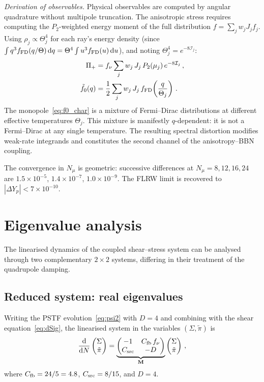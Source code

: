 \documentclass[a4paper,11pt]{article}
\newcommand{\Sig}{\Sigma}
\newcommand{\Yp}{Y_p}
\newcommand{\dd}{\mathrm{d}}
\begin{document}
\textit{Derivation of observables.}  Physical observables are computed by angular quadrature without multipole truncation.  The anisotropic stress requires computing the $P_2$-weighted energy moment of the full distribution $f = \sum_j w_j J_j f_j$.  Using $\rho_j \propto \Theta_j^4$ for each ray's energy density (since $\int q^3 f_{\rm FD}(q/\Theta)\,\dd q = \Theta^4 \int u^3 f_{\rm FD}(u)\,\dd u$), and noting $\Theta_j^4 = e^{-8\mathcal{I}_j}$:
\begin{align}
\Pi_+ &= f_\nu \sum_j w_j\,J_j\,P_2(\mu_j)\,e^{-8\mathcal{I}_j}\,,\label{eq:Pi_char}\\
\tilde{f}_0(q) &= \frac{1}{2}\sum_j w_j\,J_j\,f_{\rm FD}\!\left(\frac{q}{\Theta_j}\right)\,.\label{eq:f0_char}
\end{align}
The monopole~\eqref{eq:f0_char} is a mixture of Fermi--Dirac distributions at different effective temperatures $\Theta_j$.  This mixture is manifestly $q$-dependent: it is not a Fermi--Dirac at any single temperature.  The resulting spectral distortion modifies weak-rate integrands and constitutes the second channel of the anisotropy--BBN coupling.

The convergence in $N_\mu$ is geometric: successive differences at $N_\mu = 8, 12, 16, 24$ are $1.5\times 10^{-5}$, $1.4\times 10^{-7}$, $1.0\times 10^{-9}$.  The FLRW limit is recovered to $|\Delta\Yp| < 7\times 10^{-10}$.


\section{Eigenvalue analysis}\label{sec:eigenvalues}

The linearised dynamics of the coupled shear--stress system can be analysed through two complementary $2\times 2$ systems, differing in their treatment of the quadrupole damping.

\subsection{Reduced system: real eigenvalues}\label{sec:eigen_reduced}

Writing the PSTF evolution~\eqref{eq:psi2} with $D = 4$ and combining with the shear equation~\eqref{eq:dSig}, the linearised system in the variables $(\Sig, \tilde\pi)$ is
\begin{equation}
\frac{\dd}{\dd N}\begin{pmatrix} \Sig \\ \tilde\pi \end{pmatrix}
= \underbrace{\begin{pmatrix} -1 & C_{\rm fb}\,f_\nu \\ C_{\rm src} & -D \end{pmatrix}}_{\mathbf{M}}
\begin{pmatrix} \Sig \\ \tilde\pi \end{pmatrix}\,,\label{eq:matrix_reduced}
\end{equation}
where $C_{\rm fb} = 24/5 = 4.8$, $C_{\rm src} = 8/15$, and $D = 4$.
\end{document}
